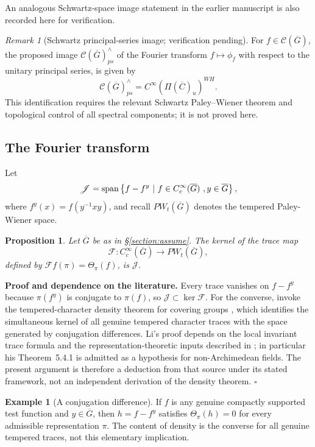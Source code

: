 \documentclass[12pt,letterpaper]{article}
\newtheorem{proposition}[theorem]{Proposition}
\theoremstyle{definition}
\newtheorem{example}[theorem]{Example}
\theoremstyle{remark}
\newtheorem{remark}[theorem]{Remark}
\newcommand{\bG}{\overline{G}}
\newcommand{\calC}{\mathcal C}
\newcommand{\sF}{\mathscr F}
\newcommand{\sJ}{\mathscr J}
\begin{document}
An analogous Schwartz-space image statement in the earlier manuscript is also recorded here for verification.

\begin{remark}[Schwartz principal-series image; verification pending]
For $f\in {\calC} (\overline{G })$, the proposed image
${\calC} (\overline{G })_{ps}^{\wedge }$
of the Fourier transform $f\longmapsto \phi_f$
with respect to the unitary principal series,
is given by 
\[
{\calC} (\overline{G })_{ps}^{\wedge }
= C^\infty(\Pi (\overline{C})_u)^{WH}.
\]
This identification requires the relevant Schwartz Paley--Wiener theorem
and topological control of all spectral components; it is not proved here.
\end{remark}


\subsection{The Fourier transform}
\label{subsec:FT}

Let
\[
\sJ={\rm span}\left\{f-f^y\ |\ f\in C_c^\infty(\overline{G })\ ,y\in 
\overline{G}\right\},
\]
where $f^y(x)=f(y^{-1}xy)$, and recall $PW_t(\overline{G })$ denotes the tempered Paley-Wiener space.

\begin{proposition}
\label{prop:kernel}
Let $\overline{G}$ be as in \S \ref{section:assume}. 
The kernel of the trace map
\[
\sF :C_c^\infty(\overline{G })\rightarrow PW_t(\overline{G }),
\]
defined by $\sF f(\pi)=\Theta_\pi(f)$, is $\sJ$.
\end{proposition}

\noindent\textbf{Proof and dependence on the literature.}
Every trace vanishes on $f-f^y$ because $\pi(f^y)$ is conjugate
to $\pi(f)$, so $\sJ\subset\ker\sF$.  For the converse, invoke
the tempered-character density theorem for covering groups
\cite[Theorem~5.8.10]{Li12}, which identifies the simultaneous kernel
of all genuine tempered character traces with the space generated
by conjugation differences.  Li's proof depends on the local invariant
trace formula and the representation-theoretic inputs described in
\cite[Sections~5.4--5.8]{Li12}; in particular his Theorem~5.4.1 is
admitted as a hypothesis for non-Archimedean fields.  The present
argument is therefore a deduction from that source under its stated
framework, not an independent derivation of the density theorem.
\hfill$\square$
\medskip

\begin{example}[A conjugation difference]\label{ex:difference}
If $f$ is any genuine compactly supported test function and $y\in\bG$,
then $h=f-f^y$ satisfies $\Theta_\pi(h)=0$ for every admissible
representation $\pi$.  The content of density is the converse for
all genuine tempered traces, not this elementary implication.
\end{example}
\end{document}
